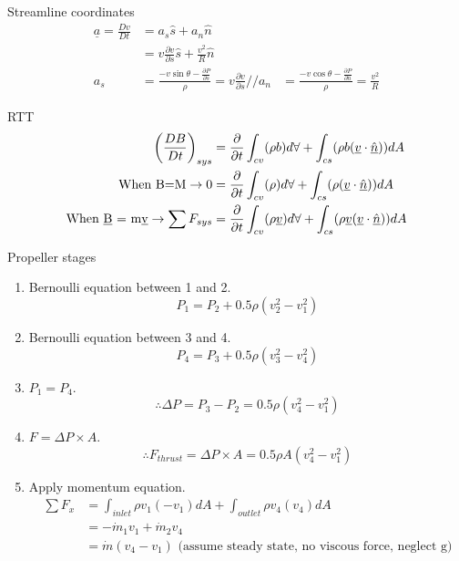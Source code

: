 \documentclass[class=report, crop=false, 12pt,a4paper]{standalone}
\begin{document}
Streamline coordinates
\begin{align}
  \underline{a} = \frac{Dv}{Dt} &= a_s\hat{s} + a_n\hat{n}\\
  &= v\frac{\partial v}{\partial s} \hat{s} + \frac{v^2}{R} \hat{n}\\
  a_s &= \frac{-v\sin \theta - \frac{\partial P}{\partial s}}{\rho} = v\frac{\partial v}{\partial s}//
  a_n &= \frac{-v\cos \theta -\frac{\partial P}{\partial n}}{\rho} = \frac{v^2}{R}
\end{align}

RTT
\begin{align}
  \left( \frac{DB}{Dt} \right)_{sys} &= \frac{\partial}{\partial t}\int_{cv}(\rho b) d\forall + \int_{cs} (\rho b(\underline{v} \cdot \underline{\hat{n}})) dA\\
  \textrm{When B=M} \rightarrow 0 &= \frac{\partial}{\partial t}\int_{cv}(\rho) d\forall + \int_{cs} (\rho(\underline{v} \cdot \underline{\hat{n}})) dA\\
  \textrm{When \underline{B} = m\underline{v}} \rightarrow \sum F_{sys} &= \frac{\partial}{\partial t}\int_{cv}(\rho \underline{v}) d\forall + \int_{cs} (\rho \underline{v} (\underline{v} \cdot \underline{\hat{n}})) dA\\
\end{align}

Propeller stages
\begin{enumerate}
  \item Bernoulli equation between 1 and 2. \[ P_1 = P_2 +0.5\rho (v_2^2 - v_1^2) \]
  \item Bernoulli equation between 3 and 4. \[ P_4 = P_3 +0.5\rho (v_3^2 - v_4^2) \]
  \item \( P_1 = P_4 \). \[ \therefore \Delta P = P_3 - P_2 = 0.5 \rho (v_4^2 - v_1^2) \]
  \item \( F=\Delta P \times A \). \[ \therefore F_{thrust} = \Delta P \times A = 0.5 \rho A (v_4^2 - v_1^2) \]
  \item Apply momentum equation.
    \begin{align*}
      \sum F_x &= \int_{inlet}\rho v_1 (-v_1)dA + \int_{outlet}\rho v_4 (v_4)dA\\
      &= -\dot{m}_1 v_1 + \dot{m}_2 v_4\\
      &= \dot{m}(v_4 - v_1) \textrm{ (assume steady state, no viscous force, neglect g)}
    \end{align*}
\end{enumerate}
\end{document}
